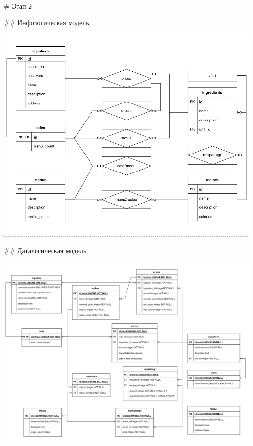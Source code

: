 \begin{markdown}
# Этап 2

## Инфологическая модель
\end{markdown}

\includegraphics[width=\linewidth]{fig/infological.png}

\begin{markdown}
## Даталогическая модель
\end{markdown}

\includegraphics[width=\linewidth]{fig/datalogical.png}


